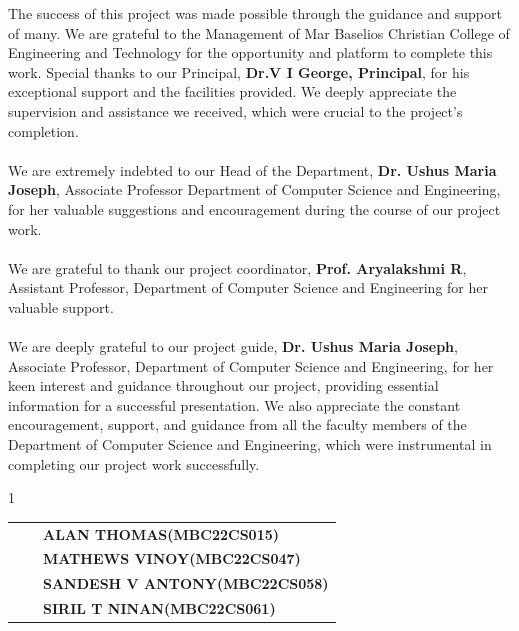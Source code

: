 \documentclass[a4paper,12pt]{report}
\begin{document}
\fontsize{12pt}{18pt}\selectfont


The success of this project was made possible through the guidance and support of many. We
are grateful to the Management of Mar Baselios Christian College of Engineering and Technology for the opportunity and platform to complete this work. Special thanks to our
Principal, \textbf{Dr.V I George, Principal}, for his exceptional support and the facilities provided. We deeply appreciate the supervision and assistance we received, which were crucial to the project's completion. \\
\\
We are extremely indebted to our Head of the Department, \textbf{Dr. Ushus Maria Joseph}, Associate Professor Department of Computer Science and Engineering, for her valuable suggestions and encouragement during the course of our project work. \\
\\
We are grateful to thank our project coordinator, \textbf{Prof. Aryalakshmi R}, Assistant Professor, Department of Computer Science and Engineering for her valuable support. \\
\\
We are deeply grateful to our project guide, \textbf{Dr. Ushus Maria Joseph}, Associate Professor, Department of Computer Science and Engineering, for her keen interest and guidance throughout our project, providing essential information for a successful presentation. We also appreciate the constant encouragement, support, and guidance from all the faculty members of the Department of Computer Science and Engineering, which were instrumental in completing our project work successfully. \\

\vspace{1cm}

\begin{spacing}{1}
	
	\begin{table}[h!]
		\centering
		\begin{tabular}{p{0.5cm} p{6cm} p{10cm}}
           \textbf{} &&\textbf {ALAN THOMAS(MBC22CS015)} \\[0.2cm]
            \textbf{} &&\textbf {MATHEWS VINOY(MBC22CS047)} \\[0.2cm]
            \textbf{} &&\textbf {SANDESH V ANTONY(MBC22CS058)} \\[0.2cm]
            \textbf{} && \textbf{SIRIL T NINAN(MBC22CS061)} \\[0.2cm]
		\end{tabular}
	\end{table}
\end{spacing}
\newpage

\end{document}
